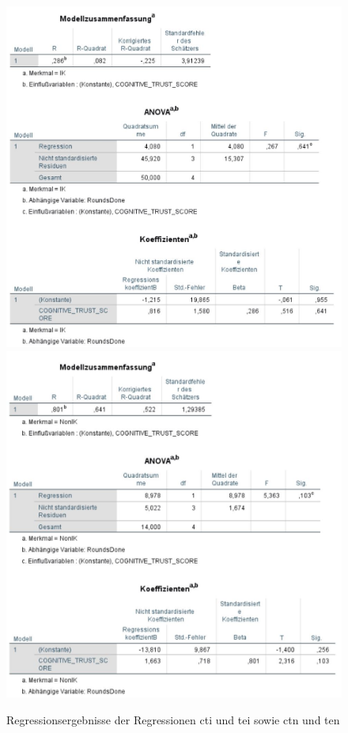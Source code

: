 \documentclass[a4paper,11pt]{article}%
\renewcommand{\\}{\vspace*{0.5\baselineskip} \newline}
\begin{document}
\begin{figure}[H]
\centering
		\begin{footnotesize}
			\includegraphics[scale=0.6]{Abbildungen/Post_QuestionnaireStatistiks/h3_regression_ik}
			\includegraphics[scale=0.6]{Abbildungen/Post_QuestionnaireStatistiks/h3_regression_nik}
			\caption{Regressionsergebnisse der Regressionen \ac{cti} und \ac{tei} sowie \ac{ctn} und \ac{ten} }
			\label{fig:h3_regression}
		\end{footnotesize}
	\end{figure}	
	
\end{document}
